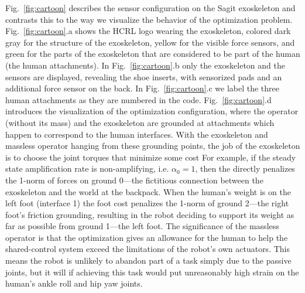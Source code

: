 Fig.~\ref{fig:cartoon} describes the sensor configuration on the Sagit exoskeleton and contrasts this to the way we visualize the behavior of the optimization problem. Fig.~\ref{fig:cartoon}.a shows the HCRL logo wearing the exoskeleton, colored dark gray for the structure of the exoskeleton, yellow for the visible force sensors, and green for the parts of the exoskeleton that are considered to be part of the human (the human attachments). In Fig.~\ref{fig:cartoon}.b only the exoskeleton and the sensors are displayed, revealing the shoe inserts, with sensorized pads and an additional force sensor on the back. In Fig.~\ref{fig:cartoon}.c we label the three human attachments as they are numbered in the code. Fig.~\ref{fig:cartoon}.d introduces the visualization of the optimization configuration, where the operator (without its mass) and the exoskeleton are grounded at attachments which happen to correspond to the human interfaces.
With the exoskeleton and massless operator hanging from these grounding points, the job of the exoskeleton is to choose the joint torques that minimize some cost
For example, if the steady state amplification rate is non-amplifying, i.e. $\alpha_0=1$, then the  directly penalizes the 1-norm of forces on ground 0---the fictitious connection between the exoskeleton and the world at the backpack. When the human's weight is on the left foot (interface 1) the foot cost penalizes the 1-norm of ground 2---the right foot's friction grounding, resulting in the robot deciding to support its weight as far as possible from ground 1---the left foot. The significance of the massless operator is that the optimization gives an allowance for the human to help the shared-control system exceed the limitations of the robot's own actuators. This means the robot is unlikely to abandon part of a task simply due to the passive joints, but it will if achieving this task would put unreasonably high strain on the human's ankle roll and hip yaw joints.

